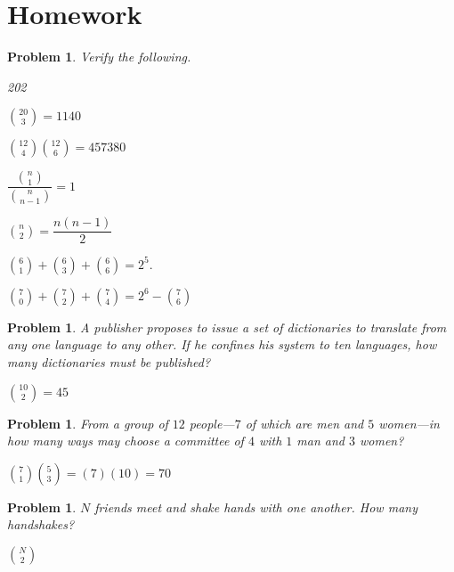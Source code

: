 \documentclass[11pt, openany]{book}
\theoremstyle{change} \theoremheaderfont{\blue\sffamily\bfseries}
\newtheorem{pro}[thm]{Problem}
\theoremstyle{nonumberplain} \theoremheaderfont{\sffamily\bfseries}
\def\binom#1#2{{#1\choose#2}}
\newcommand{\í}{\'{\i}}
\begin{document}
\section*{Homework}
\begin{multicols}{2}\columnseprule 1pt \columnsep 25pt
\begin{pro}
Verify the following.
\begin{dingautolist}{202}
\item $\binom{20}{3} = 1140$ \item $\binom{12}{4}\binom{12}{6} =
457380$ \item $\dfrac{\binom{n}{1}}{\binom{n}{n-1}} = 1$ \item
$\binom{n}{2} = \dfrac{n(n-1)}{2}$ \item $\binom{6}{1} +
\binom{6}{3} + \binom{6}{6} = 2^5.$ \item $\binom{7}{0} +
\binom{7}{2} + \binom{7}{4} = 2^6 - \binom{7}{6}$
\end{dingautolist}

      \end{pro}
              \begin{pro}
A publisher proposes to issue a set of dictionaries to translate
from any one language to any other. If he confines his system to ten
languages, how many dictionaries must be published?
\begin{answer}$\binom{10}{2} = 45$
\end{answer}
  \end{pro}

\begin{pro}
From a group of $12$ people---$7$ of which are men and $5$
women---in how many ways may choose a committee of $4$ with $1$ man
and $3$ women? \begin{answer} $\binom{7}{1}\binom{5}{3} = (7)(10) =
70 $
\end{answer}
\end{pro}
   \begin{pro}
$N$ friends meet and shake hands with one another. How many
handshakes?
\begin{answer}$\binom{N}{2}$


\end{answer}
\end{pro}
\end{multicols}
\end{document}
